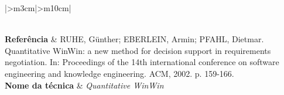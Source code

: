 \begin{longtable}{{|>{\centering\arraybackslash}m{3cm}|>{\centering\arraybackslash}m{10cm}|}}
\caption{\label{fig:t3}Quantitative WinWin: a new method for decision support in
requirements negotiation}\\
\hline
\textbf{Referência}                                         & RUHE, Günther;
EBERLEIN, Armin; PFAHL, Dietmar. Quantitative WinWin: a new method for decision
support in requirements negotiation. In: Proceedings of the 14th international
conference on software engineering and knowledge engineering. ACM, 2002. p.
159-166. \cite{ruhe2002quantitative}                                            
\\ \hline \textbf{Nome da técnica}                                    &
\textit{Quantitative WinWin}                                                    

\end{longtable}
